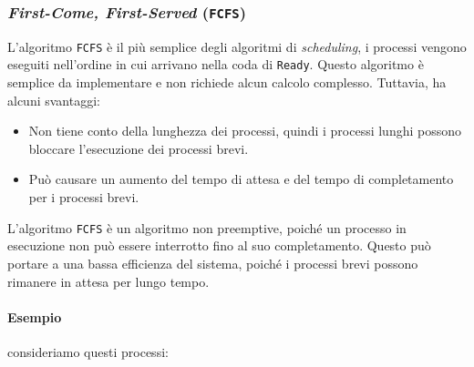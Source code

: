         \subsubsection{\textit{First-Come, First-Served} (\texttt{FCFS})}
            L'algoritmo \texttt{FCFS} è il più semplice degli algoritmi di \textit{scheduling}, i processi vengono eseguiti nell'ordine in cui arrivano nella coda di \texttt{Ready}. Questo algoritmo è semplice da implementare e non richiede alcun calcolo complesso. Tuttavia, ha alcuni svantaggi:
            \begin{itemize}
                \item Non tiene conto della lunghezza dei processi, quindi i processi lunghi possono bloccare l'esecuzione dei processi brevi.
                \item Può causare un aumento del tempo di attesa e del tempo di completamento per i processi brevi.
            \end{itemize}
            L'algoritmo \texttt{FCFS} è un algoritmo non preemptive, poiché un processo in esecuzione non può essere interrotto fino al suo completamento. Questo può portare a una bassa efficienza del sistema, poiché i processi brevi possono rimanere in attesa per lungo tempo.
            \paragraph{Esempio} consideriamo questi processi:

